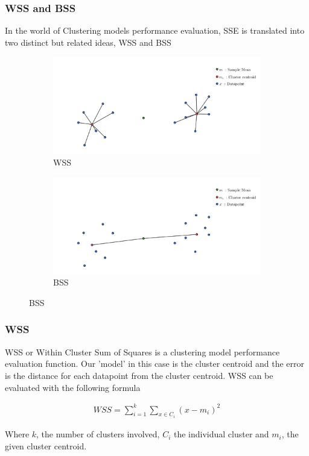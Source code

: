 \documentclass[11pt]{article}
\begin{document}
			\subsubsection*{WSS and BSS}
				In the world of Clustering models performance evaluation, SSE is translated into two distinct but related ideas\cite{???}, WSS and BSS
				\iftrue
				\begin{figure}[H]
					\centering
					\begin{subfigure}{0.4\textwidth}
						\includegraphics[width=\textwidth]{res/task-1/WSS}
						\caption{WSS}
						\label{fig:first}
					\end{subfigure}
					\hfill
					\begin{subfigure}{0.4\textwidth}
						\includegraphics[width=\textwidth]{res/task-1/BSS}
						\caption{BSS}
						\label{fig:second}
					\end{subfigure}
					\hfill
					\label{fig:figures}
				\end{figure}
				\fi
			\subsubsection*{WSS}
				WSS or  Within Cluster Sum of Squares is a clustering model performance evaluation function. Our 'model' in this case is the cluster centroid and the error is the distance for each datapoint from the cluster centroid. WSS can be evaluated with the following formula\cite{???}
				\iftrue
				\begin{align}
					WSS = \sum_{i=1}^{k}{\sum_{x\in{C_i}}^{}{(x-m_i)^2}}	
				\end{align}
				\fi
				Where $k$, the number of clusters involved, $C_i$ the individual cluster and $m_i$, the given cluster centroid.
\end{document}
